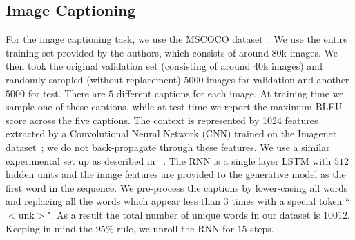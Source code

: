 \subsection{Image Captioning}
For the image captioning task, we use the MSCOCO
dataset~\citep{mscoco}. We use the entire training set provided by the authors, which consists of around $80$k images. We then took the original validation set (consisting of around $40$k images) and randomly sampled (without replacement) $5000$ images for validation and another $5000$ for test. 
There are $5$ different captions for each image. 
At training time we sample one of
these captions, while at test time we report the maximum BLEU score across the five captions.
The context is represented by 1024 features extracted by a Convolutional Neural Network (CNN) trained
on the Imagenet dataset~\citep{imagenet_cvpr09}; we do not back-propagate through these features. We use a similar experimental set up as described in ~\citet{sbengio-nips2015}. The RNN is a single layer LSTM with 
$512$ hidden units and the image features are provided to the generative model as the first word in the sequence. We pre-process the captions by lower-casing all words and replacing all the words which appear less than 3 times with a special token ``$<$unk$>$". As a result the total number of unique words in our dataset is $10012$. Keeping in mind the $95\%$ rule, we unroll the RNN for $15$ steps.

